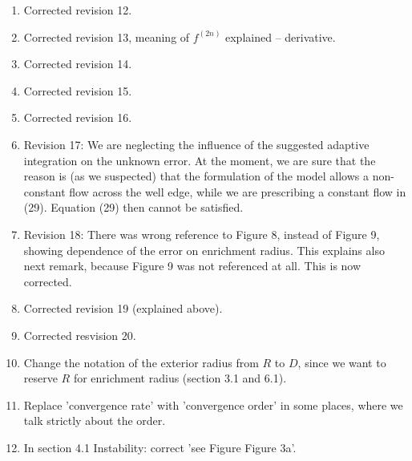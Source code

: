 \documentclass[a4paper,11pt]{article}
\begin{document}
\begin{enumerate}
\item Corrected revision 12. %
\item Corrected revision 13, meaning of $f^{(2n)}$ explained -- derivative. %
\item Corrected revision 14. %
\item Corrected revision 15. %
\item Corrected revision 16. %

\item Revision 17: We are neglecting the influence of the suggested adaptive integration on the unknown error. 
      At the moment, we are sure that the reason is (as we suspected) that the formulation of the model allows a non-constant
      flow across the well edge, while we are prescribing a constant flow in (29). Equation (29) then cannot be satisfied. %

\item Revision 18: There was wrong reference to Figure 8, instead of Figure 9, showing dependence of the error on enrichment radius. %
      This explains also next remark, because Figure 9 was not referenced at all.
      This is now corrected. %
\item Corrected revision 19 (explained above). %
\item Corrected resvision 20. %
\item Change the notation of the exterior radius from $R$ to $D$, since we want to reserve $R$ for enrichment radius (section 3.1 and 6.1).
\item Replace 'convergence rate' with 'convergence order' in some places, where we talk strictly about the order.
\item In section 4.1 Instability: correct 'see Figure Figure 3a'.

\end{enumerate} 
\end{document}
